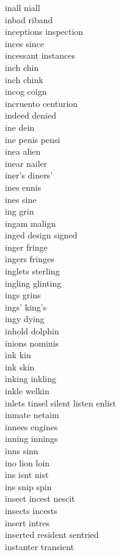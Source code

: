 inall niall\\
inbad riband \\
inceptions inspection\\
inces since\\
incessant instances\\
inch chin\\
inch chink \\
incog coign\\
incruento centurion\\
indeed denied\\
ine dein \\
ine penis pensi  \\
inea alien \\
inear nailer \\
iner's diners' \\
ines ennis \\
ines sine\\
ing grin \\
ingam malign \\
inged design signed \\
inger fringe \\
ingers fringes \\
inglets sterling \\
ingling glinting \\
ings grins \\
ings' king's \\
ingy dying \\
inhold dolphin \\
inions nominis \\
ink kin\\
ink skin \\
inking inkling \\
inkle welkin \\
inlets tinsel silent listen enlist\\
inmate netaim\\
innees engines \\
inning innings \\
inns sinn\\
ino lion loin \\
ins isnt nist \\
ins snip spin \\
insect incest nescit\\
insects incests\\
insert intres\\
inserted resident sentried\\
instanter transient\\
